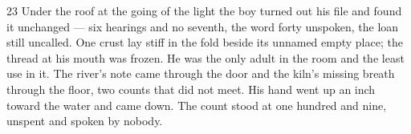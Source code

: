 \begin{CRchronicle}{23}
Under the roof at the going of the light the boy turned out his file and found it unchanged — six hearings and no seventh, the word forty unspoken, the loan still uncalled. One crust lay stiff in the fold beside its unnamed empty place; the thread at his mouth was frozen. He was the only adult in the room and the least use in it. The river’s note came through the door and the kiln’s missing breath through the floor, two counts that did not meet. His hand went up an inch toward the water and came down. The count stood at one hundred and nine, unspent and spoken by nobody.
\end{CRchronicle}
